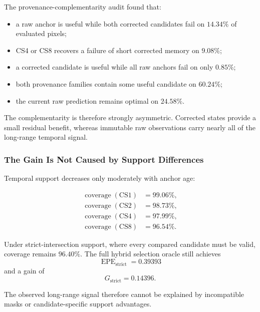 \documentclass[11pt,a4paper]{article}
\begin{document}
The provenance-complementarity audit found that:

\begin{itemize}
    \item a raw anchor is useful while both corrected candidates fail on \(14.34\%\) of
    evaluated pixels;
    \item CS4 or CS8 recovers a failure of short corrected memory on \(9.08\%\);
    \item a corrected candidate is useful while all raw anchors fail on only \(0.85\%\);
    \item both provenance families contain some useful candidate on \(60.24\%\);
    \item the current raw prediction remains optimal on \(24.58\%\).
\end{itemize}

The complementarity is therefore strongly asymmetric. Corrected states provide a small
residual benefit, whereas immutable raw observations carry nearly all of the long-range
temporal signal.

\subsubsection{The Gain Is Not Caused by Support Differences}

Temporal support decreases only moderately with anchor age:

\begin{align}
    \operatorname{coverage}(\mathrm{CS1})
    &= 99.06\%,\\
    \operatorname{coverage}(\mathrm{CS2})
    &= 98.73\%,\\
    \operatorname{coverage}(\mathrm{CS4})
    &= 97.99\%,\\
    \operatorname{coverage}(\mathrm{CS8})
    &= 96.54\%.
\end{align}

Under strict-intersection support, where every compared candidate must be valid, coverage
remains \(96.40\%\). The full hybrid selection oracle still achieves
\begin{equation}
    \operatorname{EPE}_{\mathrm{strict}}
    =
    0.39393
\end{equation}
and a gain of
\begin{equation}
    G_{\mathrm{strict}}
    =
    0.14396.
\end{equation}

The observed long-range signal therefore cannot be explained by incompatible masks or
candidate-specific support advantages.
\end{document}

